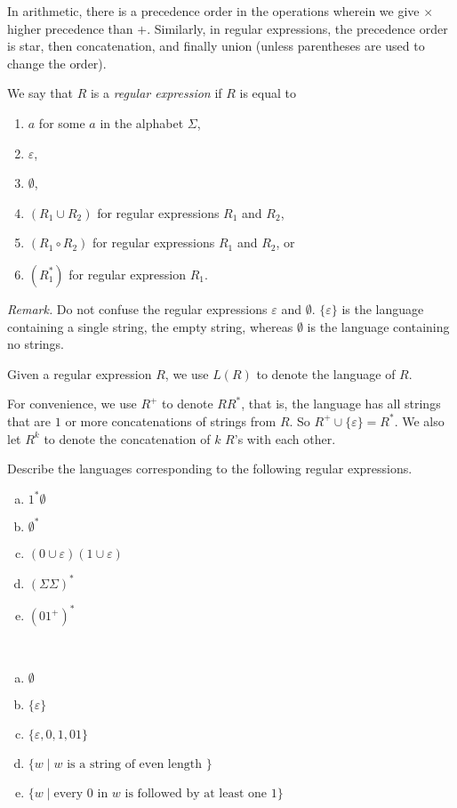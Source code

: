 In arithmetic, there is a precedence order in the operations wherein we give $\times$ higher precedence than $+$. Similarly, in regular expressions, the precedence order is star, then concatenation, and finally union (unless parentheses are used to change the order).

\begin{definition}
We say that $R$ is a \textit{regular expression} if $R$ is equal to
\begin{enumerate}
    \item $a$ for some $a$ in the alphabet $\Sigma$,
    \item $\varepsilon$,
    \item $\emptyset$,
    \item $(R_1\cup R_2)$ for regular expressions $R_1$ and $R_2$,
    \item $(R_1\circ R_2)$ for regular expressions $R_1$ and $R_2$, or
    \item $(R_1^*)$ for regular expression $R_1$.
\end{enumerate}
\end{definition}


\textit{Remark.} Do not confuse the regular expressions $\varepsilon$ and $\emptyset$. $\{\varepsilon\}$ is the language containing a single string, the empty string, whereas $\emptyset$ is the language containing no strings.

\vspace{2mm}
Given a regular expression $R$, we use $L(R)$ to denote the language of $R$.

For convenience, we use $R^+$ to denote $RR^*$, that is, the language has all strings that are $1$ or more concatenations of strings from $R$. So $R^+\cup\{\varepsilon\}=R^*$. We also let $R^k$ to denote the concatenation of $k$ $R$'s  with each other.

\begin{exercise}
Describe the languages corresponding to the following regular expressions.
\begin{enumerate}[(a)]
    \item $1^*\emptyset$
    \item $\emptyset^*$
    \item $(0\cup\varepsilon)(1\cup\varepsilon)$
    \item $(\Sigma\Sigma)^*$
    \item $(01^+)^*$
\end{enumerate}
\end{exercise}
\begin{solution}
~
\begin{enumerate}[(a)]
    \item $\emptyset$
    \item $\{\varepsilon\}$
    \item $\{\varepsilon,0,1,01\}$
    \item $\{w\mid w\text{ is a string of even length }\}$
    \item $\{w\mid \text{every $0$ in $w$ is followed by at least one $1$}\}$
\end{enumerate}
\end{solution}


